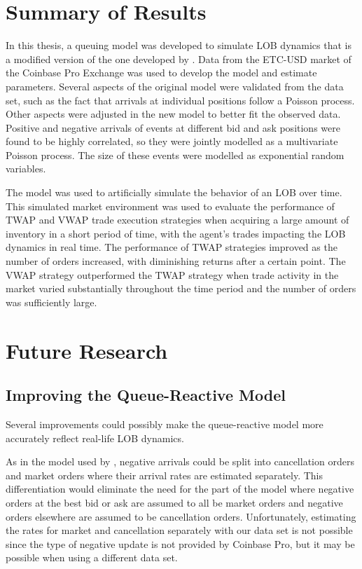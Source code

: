 \section{Summary of Results}
In this thesis, a queuing model was developed to simulate LOB dynamics that is a modified version of the one developed by \cite{A6}. Data from the ETC-USD market of the Coinbase Pro Exchange was used to develop the model and estimate parameters. Several aspects of the original model were validated from the data set, such as the fact that arrivals at individual positions follow a Poisson process. Other aspects were adjusted in the new model to better fit the observed data. Positive and negative arrivals of events at different bid and ask positions were found to be highly correlated, so they were jointly modelled as a multivariate Poisson process. The size of these events were modelled as exponential random variables. 

The model was used to artificially simulate the behavior of an LOB over time. This simulated market environment was used to evaluate the performance of TWAP and VWAP trade execution strategies when acquiring a large amount of inventory in a short period of time, with the agent's trades impacting the LOB dynamics in real time. The performance of TWAP strategies improved as the number of orders increased, with diminishing returns after a certain point. The VWAP strategy outperformed the TWAP strategy when trade activity in the market varied substantially throughout the time period and the number of orders was sufficiently large.

\section{Future Research}
\subsection{Improving the Queue-Reactive Model}
Several improvements could possibly make the queue-reactive model more accurately reflect real-life LOB dynamics. 

As in the model used by \cite{A6}, negative arrivals could be split into cancellation orders and market orders where their arrival rates are estimated separately. This differentiation would eliminate the need for the part of the model where negative orders at the best bid or ask are assumed to all be market orders and negative orders elsewhere are assumed to be cancellation orders. Unfortunately, estimating the rates for market and cancellation separately with our data set is not possible since the type of negative update is not provided by Coinbase Pro, but it may be possible when using a different data set.

